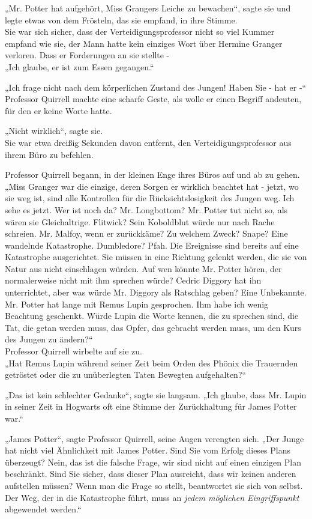 {„Mr. Potter hat aufgehört, Miss Grangers Leiche zu bewachen“, sagte sie und legte etwas von dem Frösteln, das sie empfand, in ihre Stimme.\\ Sie war sich sicher, dass der Verteidigungsprofessor nicht so viel Kummer empfand wie sie, der Mann hatte kein einziges Wort über Hermine Granger verloren. Dass er Forderungen an sie stellte -\\ „Ich glaube, er ist zum Essen gegangen.“

„Ich frage nicht nach dem körperlichen Zustand des Jungen! Haben Sie - hat er -“ Professor Quirrell machte eine scharfe Geste, als wolle er einen Begriff andeuten, für den er keine Worte hatte.

„Nicht wirklich“, sagte sie.\\ Sie war etwa dreißig Sekunden davon entfernt, den Verteidigungsprofessor aus ihrem Büro zu befehlen.

Professor Quirrell begann, in der kleinen Enge ihres Büros auf und ab zu gehen. „Miss Granger war die einzige, deren Sorgen er wirklich beachtet hat - jetzt, wo sie weg ist, sind alle Kontrollen für die Rücksichtslosigkeit des Jungen weg. Ich sehe es jetzt. Wer ist noch da? Mr. Longbottom? Mr. Potter tut nicht so, als wären sie Gleichaltrige. Flitwick? Sein Koboldblut würde nur nach Rache schreien. Mr. Malfoy, wenn er zurückkäme? Zu welchem Zweck? Snape? Eine wandelnde Katastrophe. Dumbledore? Pfah. Die Ereignisse sind bereits auf eine Katastrophe ausgerichtet. Sie müssen in eine Richtung gelenkt werden, die sie von Natur aus nicht einschlagen würden. Auf wen könnte Mr. Potter hören, der normalerweise nicht mit ihm sprechen würde? Cedric Diggory hat ihn unterrichtet, aber was würde Mr. Diggory als Ratschlag geben? Eine Unbekannte. Mr. Potter hat lange mit Remus Lupin gesprochen. Ihm habe ich wenig Beachtung geschenkt. Würde Lupin die Worte kennen, die zu sprechen sind, die Tat, die getan werden muss, das Opfer, das gebracht werden muss, um den Kurs des Jungen zu ändern?“\\ Professor Quirrell wirbelte auf sie zu.\\ „Hat Remus Lupin während seiner Zeit beim Orden des Phönix die Trauernden getröstet oder die zu unüberlegten Taten Bewegten aufgehalten?“

„Das ist kein schlechter Gedanke“, sagte sie langsam. „Ich glaube, dass Mr. Lupin in seiner Zeit in Hogwarts oft eine Stimme der Zurückhaltung für James Potter war.“

„James Potter“, sagte Professor Quirrell, seine Augen verengten sich. „Der Junge hat nicht viel Ähnlichkeit mit James Potter. Sind Sie vom Erfolg dieses Plans überzeugt? Nein, das ist die falsche Frage, wir sind nicht auf einen einzigen Plan beschränkt. Sind Sie sicher, dass dieser Plan ausreicht, dass wir keinen anderen aufstellen müssen? Wenn man die Frage so stellt, beantwortet sie sich von selbst. Der Weg, der in die Katastrophe führt, muss an \emph{jedem möglichen Eingriffspunkt} abgewendet werden.“

}
